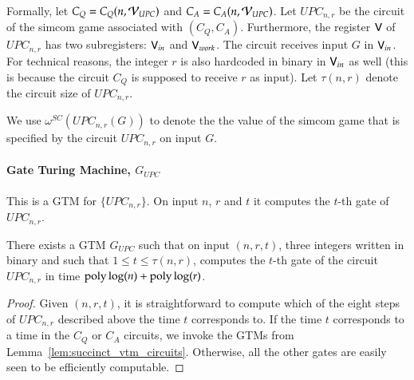 Formally, let $C_Q = C_Q(n,\mathcal V_{UPC})$ and $C_A = C_A(n,\mathcal V_{UPC})$. Let $UPC_{n,r}$ be the circuit of the simcom game associated with $(C_Q,C_A)$. Furthermore, the register ${\mathsf{V}}$ of $UPC_{n,r}$ has two subregisters: ${\mathsf{V}}_{in}$ and ${\mathsf{V}}_{work}$. The circuit receives input $G$ in ${\mathsf{V}}_{in}$. For technical reasons, the integer $r$ is also hardcoded in binary in ${\mathsf{V}}_{in}$ as well (this is because the circuit $C_Q$ is supposed to receive $r$ as input). Let $\tau(n,r)$ denote the circuit size of $UPC_{n,r}$. 


We use $\omega^{SC}(UPC_{n,r}(G))$ to denote the the value of the simcom game that is specified by the circuit $UPC_{n,r}$ on input $G$.

\paragraph{Gate Turing Machine, $G_{UPC}$} This is a GTM for $\{UPC_{n,r}\}$. On input $n$, $r$ and $t$ it computes the $t$-th gate of $UPC_{n,r}$. 

\begin{lemma}
	There exists a GTM $G_{UPC}$ such that on input $(n,r,t)$, three integers written in binary and such that $1 \leq t \leq \tau(n,r)$, computes the $t$-th gate of the circuit $UPC_{n,r}$ in time $\operatorname{poly}\log(n) + \operatorname{poly} \log(r)$.
\end{lemma}

\begin{proof}
	Given $(n,r,t)$, it is straightforward to compute which of the eight steps of $UPC_{n,r}$ described above the time $t$ corresponds to. If the time $t$ corresponds to a time in the $C_Q$ or $C_A$ circuits, we invoke the GTMs from Lemma~\ref{lem:succinct_vtm_circuits}. Otherwise, all the other gates are easily seen to be efficiently computable. 
\end{proof}
%
%




